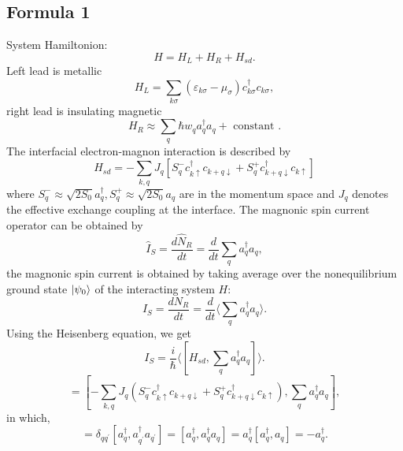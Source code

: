 \documentclass[11pt,a4paper]{article}
\begin{document}
\subsection{Formula 1}
System Hamiltonion:
\begin{equation}
H=H_{L}+H_{R}+H_{s d}.
\end{equation}
Left lead is metallic
\begin{equation}
H_{L} = \sum_{k\sigma} \left(\varepsilon_{k\sigma}-\mu_{\sigma}\right) c_{k \sigma}^{\dagger} c_{k \sigma},
\end{equation}
right lead is insulating magnetic
\begin{equation}
H_{R} \approx \sum_{q} \hbar w_{q} a_{q}^{\dagger} a_{q}+\text { constant }.
\end{equation}
The interfacial electron-magnon interaction is described by
\begin{equation}
H_{s d}=-\sum_{k, q} J_{q}\left[S_{q}^{-} c_{k \uparrow}^{\dagger} c_{k+q \downarrow}+S_{q}^{+} c_{k+q \downarrow}^{\dagger} c_{k \uparrow}\right]
\end{equation}
where $S_{q}^{-} \approx \sqrt{2 S_{0}} a_{q}^{\dagger}, S_{q}^{+} \approx \sqrt{2 S_{0}} a_{q}$ are in the momentum space and $J_{q}$ denotes the effective exchange coupling at the interface. The magnonic spin current operator can be obtained by
\begin{equation}
\hat{I}_{S} = \frac{d\hat{N}_{R}}{dt} =  \frac{d}{dt} \sum_{q}a_{q}^{\dag}a_{q},
\end{equation}
the magnonic spin current is obtained by taking average over the nonequilibrium ground state $\ket{\psi_{0}}$ of the interacting system $H$:
\begin{equation}
I_{S} = \frac{dN_{R}}{dt} =  \frac{d}{dt} \langle \sum_{q}a_{q}^{\dag}a_{q}\rangle.
\end{equation}
Using the Heisenberg equation, we get
\begin{equation}
I_{S}=\frac{i}{\hbar}\langle[H_{s d}, \sum_{q} a_{q}^{\dagger} a_{q}]\rangle.
\end{equation}
\begin{equation}
[H_{s d}, \sum_{q} a_{q}^{\dagger} a_{q}] = [-\sum_{k, q} J_{q}\left(S_{q}^{-} c_{k \uparrow}^{\dagger} c_{k+q \downarrow}+S_{q}^{+} c_{k+q \downarrow}^{\dagger} c_{k \uparrow}\right), \sum_{q} a_{q}^{\dagger} a_{q}],
\end{equation}
in which,
\begin{equation}
[a_{q}^{\dag}, \sum_{q^{\prime}} a_{q'}^{\dagger}, a_{q^{\prime}}] = \delta_{q q^{\prime}}[a_{q}^{\dagger}, a_{q^{\prime}}^{\dagger} a_{q^{\prime}}] = [a_{q}^{\dagger}, a_{q}^{\dagger} a_{q}] = a_{q}^{\dagger}[a_{q}^{\dagger}, a_{q}] = - a_{q}^{\dagger}.
\end{equation}
\end{document}
